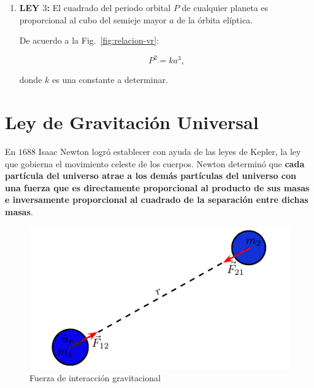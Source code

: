 \begin{enumerate}
\item \textbf{LEY $3$:} El cuadrado del periodo orbital $P$ de cualquier planeta es proporcional al cubo del semieje mayor $a$ de la órbita elíptica.

De acuerdo a la Fig.~\ref{fig:relacion-vr}:

\begin{equation}
P^2= k a^3 ,
\end{equation}

donde $k$ es una constante a determinar.

\end{enumerate}











\section{Ley de Gravitación Universal}

En $1688$ Isaac Newton logró establecer con ayuda de las leyes de Kepler, la ley que gobierna el movimiento celeste de los cuerpos. Newton determinó que \textbf{cada partícula del universo atrae a los demás partículas del universo con una fuerza que es directamente proporcional al producto de sus masas e inversamente proporcional al cuadrado de la separación entre dichas masas}.

\begin{figure}[h]
\begin{center}
\includegraphics[scale=0.9]{gravitacion/fuerzagravitacional}
\end{center}
\label{fuerzagravitacional}
\caption{Fuerza de interacción gravitacional}
\end{figure}

